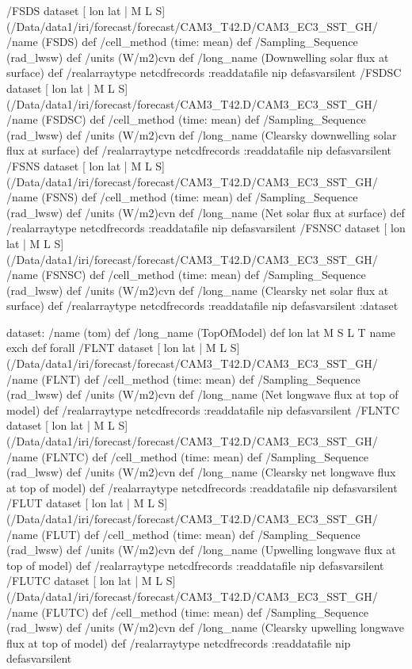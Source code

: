 \begin{ingrid}
 /FSDS{
dataset
[ lon lat | M L S] (/Data/data1/iri/forecast/forecast/CAM3_T42.D/CAM3_EC3_SST_GH/%
/name (FSDS) def
 /cell_method (time: mean) def
 /Sampling_Sequence (rad_lwsw) def
 /units (W/m2)cvn def
 /long_name (Downwelling solar flux at surface) def
 /realarraytype netcdfrecords :readdatafile
nip
}defasvarsilent
 /FSDSC{
dataset
[ lon lat | M L S] (/Data/data1/iri/forecast/forecast/CAM3_T42.D/CAM3_EC3_SST_GH/%
/name (FSDSC) def
 /cell_method (time: mean) def
 /Sampling_Sequence (rad_lwsw) def
 /units (W/m2)cvn def
 /long_name (Clearsky downwelling solar flux at surface) def
 /realarraytype netcdfrecords :readdatafile
nip
}defasvarsilent
 /FSNS{
dataset
[ lon lat | M L S] (/Data/data1/iri/forecast/forecast/CAM3_T42.D/CAM3_EC3_SST_GH/%
/name (FSNS) def
 /cell_method (time: mean) def
 /Sampling_Sequence (rad_lwsw) def
 /units (W/m2)cvn def
 /long_name (Net solar flux at surface) def
 /realarraytype netcdfrecords :readdatafile
nip
}defasvarsilent
 /FSNSC{
dataset
[ lon lat | M L S] (/Data/data1/iri/forecast/forecast/CAM3_T42.D/CAM3_EC3_SST_GH/%
/name (FSNSC) def
 /cell_method (time: mean) def
 /Sampling_Sequence (rad_lwsw) def
 /units (W/m2)cvn def
 /long_name (Clearsky net solar flux at surface) def
 /realarraytype netcdfrecords :readdatafile
nip
}defasvarsilent
:dataset

dataset:
/name (tom) def
/long_name (TopOfModel) def
{ lon lat M S L T } { name exch def} forall
 /FLNT{
dataset
[ lon lat | M L S] (/Data/data1/iri/forecast/forecast/CAM3_T42.D/CAM3_EC3_SST_GH/%
/name (FLNT) def
 /cell_method (time: mean) def
 /Sampling_Sequence (rad_lwsw) def
 /units (W/m2)cvn def
 /long_name (Net longwave flux at top of model) def
 /realarraytype netcdfrecords :readdatafile
nip
}defasvarsilent
 /FLNTC{
dataset
[ lon lat | M L S] (/Data/data1/iri/forecast/forecast/CAM3_T42.D/CAM3_EC3_SST_GH/%
/name (FLNTC) def
 /cell_method (time: mean) def
 /Sampling_Sequence (rad_lwsw) def
 /units (W/m2)cvn def
 /long_name (Clearsky net longwave flux at top of model) def
 /realarraytype netcdfrecords :readdatafile
nip
}defasvarsilent
 /FLUT{
dataset
[ lon lat | M L S] (/Data/data1/iri/forecast/forecast/CAM3_T42.D/CAM3_EC3_SST_GH/%
/name (FLUT) def
 /cell_method (time: mean) def
 /Sampling_Sequence (rad_lwsw) def
 /units (W/m2)cvn def
 /long_name (Upwelling longwave flux at top of model) def
 /realarraytype netcdfrecords :readdatafile
nip
}defasvarsilent
 /FLUTC{
dataset
[ lon lat | M L S] (/Data/data1/iri/forecast/forecast/CAM3_T42.D/CAM3_EC3_SST_GH/%
/name (FLUTC) def
 /cell_method (time: mean) def
 /Sampling_Sequence (rad_lwsw) def
 /units (W/m2)cvn def
 /long_name (Clearsky upwelling longwave flux at top of model) def
 /realarraytype netcdfrecords :readdatafile
nip
}defasvarsilent



\end{ingrid}
